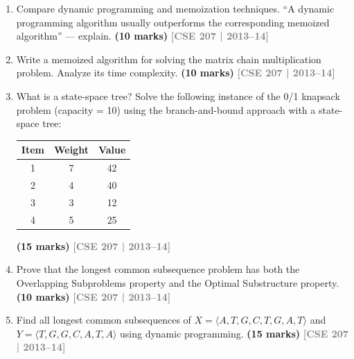 \documentclass[12pt,a3paper]{article}
\newcommand{\yr}[1]{\hfill\textcolor{gray}{\small\textbf{[#1]}}}
\newcommand{\mk}[1]{\textcolor{orange!70!black}{\small\textbf{(#1 marks)}}}
\begin{document}
\begin{enumerate}

\item Compare dynamic programming and memoization techniques. ``A dynamic programming algorithm usually outperforms the corresponding memoized algorithm'' --- explain. \mk{10}
\yr{CSE 207 | 2013--14}

\item Write a memoized algorithm for solving the matrix chain multiplication problem. Analyze its time complexity. \mk{10}
\yr{CSE 207 | 2013--14}

\item What is a state-space tree? Solve the following instance of the 0/1 knapsack problem (capacity = 10) using the branch-and-bound approach with a state-space tree:
\begin{center}
\begin{tabular}{ccc}
\toprule
Item & Weight & Value \\
\midrule
1 & 7 & 42 \\
2 & 4 & 40 \\
3 & 3 & 12 \\
4 & 5 & 25 \\
\bottomrule
\end{tabular}
\end{center}
\mk{15}
\yr{CSE 207 | 2013--14}

\item Prove that the longest common subsequence problem has both the Overlapping Subproblems property and the Optimal Substructure property. \mk{10}
\yr{CSE 207 | 2013--14}


\item Find all longest common subsequences of $X = \langle A,T,G,C,T,G,A,T \rangle$ and $Y = \langle T,G,G,C,A,T,A \rangle$ using dynamic programming. \mk{15}
\yr{CSE 207 | 2013--14}


\end{enumerate}
\end{document}
